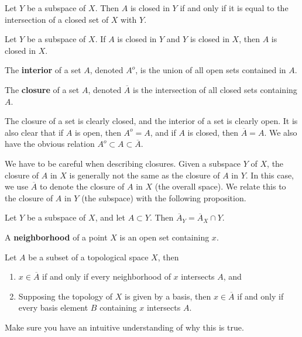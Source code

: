 \documentclass[twoside,10pt]{report}
\begin{document}
\begin{prop}
Let $Y$ be a subspace of $X$. Then $A$ is closed in $Y$ if and only if it is equal to the intersection of a closed set of $X$ with $Y$.
\end{prop}

\begin{prop}
Let $Y$ be a subspace of $X$. If $A$ is closed in $Y$ and $Y$ is closed in $X$, then $A$ is closed in $X$.
\end{prop}

\begin{defn}
	The \textbf{interior} of a set $A$, denoted $A^o$, is the union of all open sets contained in $A$.

	The \textbf{closure} of a set $A$, denoted $\overline{A}$ is the intersection of all closed sets containing $A$.
\end{defn}

The closure of a set is clearly closed, and the interior of a set is clearly open. It is also clear that if $A$ is open, then $A^o = A$, and if $A$ is closed, then $\overline{A}=A$. We also have the obvious relation $A^o \subset A \subset \overline{A}$.

We have to be careful when describing closures. Given a subspace $Y$ of $X$, the closure of $A$ in $X$ is generally not the same as the closure of $A$ in $Y$. In this case, we use $\overline{A}$ to denote the closure of $A$ in $X$ (the overall space). We relate this to the closure of $A$ in $Y$ (the subspace) with the following proposition.

\begin{prop}
	Let $Y$ be a subspace of $X$, and let $A \subset Y$. Then $\overline{A}_{Y}=\overline{A}_{X} \cap Y$.
\end{prop}

\begin{defn}
A \textbf{neighborhood} of a point $X$ is an open set containing $x$.
\end{defn}

\begin{thrm}
	\label{thrm:nhood-closure}
Let $A$ be a subset of a topological space $X$, then
\begin{enumerate}
	\item $x \in \overline{A}$ if and only if every neighborhood of $x$ intersects $A$, and
	\item Supposing the topology of $X$ is given by a basis, then $x \in \overline{A}$ if and only if every basis element $B$ containing $x$ intersects $A$.
\end{enumerate}
\end{thrm}
{\color{red}Make sure you have an intuitive understanding of why this is true.}
\end{document}
